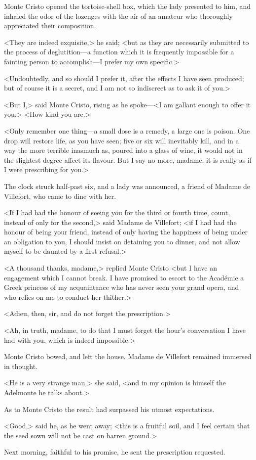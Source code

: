  Monte Cristo opened the tortoise-shell box, which the lady presented to him, and inhaled the odor of the lozenges with the air of an amateur who thoroughly appreciated their composition. 

 <They are indeed exquisite,> he said; <but as they are necessarily submitted to the process of deglutition—a function which it is frequently impossible for a fainting person to accomplish—I prefer my own specific.> 

 <Undoubtedly, and so should I prefer it, after the effects I have seen produced; but of course it is a secret, and I am not so indiscreet as to ask it of you.> 

 <But I,> said Monte Cristo, rising as he spoke—<I am gallant enough to offer it you.>  <How kind you are.> 

 <Only remember one thing—a small dose is a remedy, a large one is poison. One drop will restore life, as you have seen; five or six will inevitably kill, and in a way the more terrible inasmuch as, poured into a glass of wine, it would not in the slightest degree affect its flavour. But I say no more, madame; it is really as if I were prescribing for you.> 

 The clock struck half-past six, and a lady was announced, a friend of Madame de Villefort, who came to dine with her. 

 <If I had had the honour of seeing you for the third or fourth time, count, instead of only for the second,> said Madame de Villefort; <if I had had the honour of being your friend, instead of only having the happiness of being under an obligation to you, I should insist on detaining you to dinner, and not allow myself to be daunted by a first refusal.> 

 <A thousand thanks, madame,> replied Monte Cristo <but I have an engagement which I cannot break. I have promised to escort to the Académie a Greek princess of my acquaintance who has never seen your grand opera, and who relies on me to conduct her thither.> 

 <Adieu, then, sir, and do not forget the prescription.> 

 <Ah, in truth, madame, to do that I must forget the hour's conversation I have had with you, which is indeed impossible.> 

 Monte Cristo bowed, and left the house. Madame de Villefort remained immersed in thought. 

 <He is a very strange man,> she said, <and in my opinion is himself the Adelmonte he talks about.> 

 As to Monte Cristo the result had surpassed his utmost expectations. 

 <Good,> said he, as he went away; <this is a fruitful soil, and I feel certain that the seed sown will not be cast on barren ground.> 

 Next morning, faithful to his promise, he sent the prescription requested. 